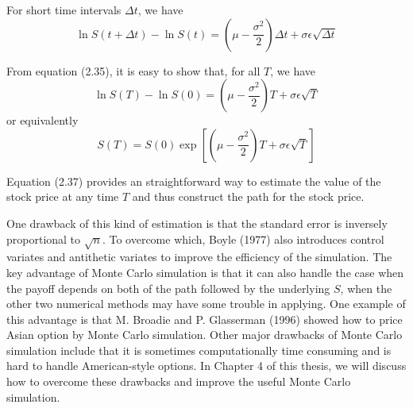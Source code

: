 \documentclass[11pt]{book}
\begin{document}
For short time intervals $\Delta t$, we have
\begin{equation}
\ln{S(t+\Delta t)}-\ln{S(t)}=(\mu-\frac{\sigma^2}{2})\Delta t+\sigma
\epsilon \sqrt{\Delta t}
\end{equation}

From equation (2.35), it is easy to show that, for all $T$, we have
\begin{equation}
\ln{S(T)}-\ln{S(0)}=(\mu-\frac{\sigma^2}{2})T+\sigma \epsilon
\sqrt{T}
\end{equation}
or equivalently
\begin{equation}
S(T)=S(0)\exp[(\mu-\frac{\sigma^2}{2})T+\sigma \epsilon \sqrt{T}]
\end{equation}

Equation (2.37) provides an straightforward way to estimate the
value of the stock price at any time $T$ and thus construct the path
for the stock price.

One drawback of this kind of estimation is that the standard error
is inversely proportional to $\sqrt{n}$. To overcome which, Boyle
(1977) also introduces control variates and antithetic variates to
improve the efficiency of the simulation. The key advantage of Monte
Carlo simulation is that it can also handle the case when the payoff
depends on both of the path followed by the underlying $S$, when the
other two numerical methods may have some trouble in applying. One
example of this advantage is that M. Broadie and P. Glasserman
(1996) showed how to price Asian option by Monte Carlo simulation.
Other major drawbacks of Monte Carlo simulation include that it is
sometimes computationally time consuming and is hard to handle
American-style options. In Chapter 4 of this thesis, we will discuss
how to overcome these drawbacks and improve the useful Monte Carlo
simulation.
\end{document}
